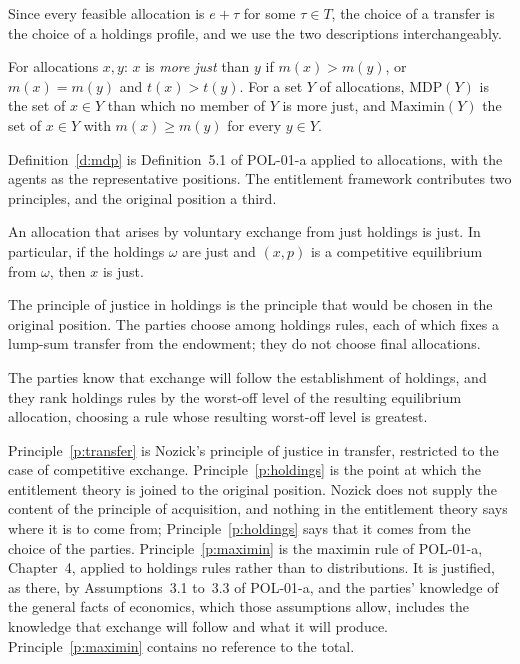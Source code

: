 \documentclass{situationist-preprint}
\begin{document}
Since every feasible allocation is $e + \tau$ for some $\tau \in T$, the choice of a transfer is the choice of a holdings profile, and we use the two descriptions interchangeably.

\begin{definition}\label{d:mdp}
For allocations $x, y$: $x$ is \emph{more just} than $y$ if $m(x) > m(y)$, or $m(x) = m(y)$ and $t(x) > t(y)$. For a set $Y$ of allocations, $\mathrm{MDP}(Y)$ is the set of $x \in Y$ than which no member of $Y$ is more just, and $\mathrm{Maximin}(Y)$ the set of $x \in Y$ with $m(x) \geq m(y)$ for every $y \in Y$.
\end{definition}

Definition~\ref{d:mdp} is Definition~5.1 of POL-01-a applied to allocations, with the agents as the representative positions. The entitlement framework contributes two principles, and the original position a third.

\begin{principle}\label{p:transfer}
An allocation that arises by voluntary exchange from just holdings is just. In particular, if the holdings $\omega$ are just and $(x, p)$ is a competitive equilibrium from $\omega$, then $x$ is just.
\end{principle}

\begin{principle}\label{p:holdings}
The principle of justice in holdings is the principle that would be chosen in the original position. The parties choose among holdings rules, each of which fixes a lump-sum transfer from the endowment; they do not choose final allocations.
\end{principle}

\begin{principle}\label{p:maximin}
The parties know that exchange will follow the establishment of holdings, and they rank holdings rules by the worst-off level of the resulting equilibrium allocation, choosing a rule whose resulting worst-off level is greatest.
\end{principle}

Principle~\ref{p:transfer} is Nozick's principle of justice in transfer, restricted to the case of competitive exchange. Principle~\ref{p:holdings} is the point at which the entitlement theory is joined to the original position. Nozick does not supply the content of the principle of acquisition, and nothing in the entitlement theory says where it is to come from; Principle~\ref{p:holdings} says that it comes from the choice of the parties. Principle~\ref{p:maximin} is the maximin rule of POL-01-a, Chapter~4, applied to holdings rules rather than to distributions. It is justified, as there, by Assumptions~3.1 to~3.3 of POL-01-a, and the parties' knowledge of the general facts of economics, which those assumptions allow, includes the knowledge that exchange will follow and what it will produce. Principle~\ref{p:maximin} contains no reference to the total.
\end{document}

